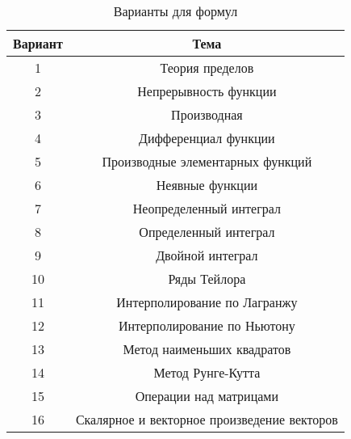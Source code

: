\documentclass[a4paper]{article}
\begin{document}
\begin{table}[h]
      \caption{Варианты для формул}
      \begin{center}\label{tab:math}
      \begin{tabular}{|c|c|}
        \hline
        Вариант & Тема \\
        \hline
        1 & Теория пределов\\
        \hline
        2 & Непрерывность функции\\
        \hline
        3 & Производная\\
        \hline
        4 & Дифференциал функции\\
        \hline
        5 & Производные элементарных функций\\
        \hline
        6 & Неявные функции\\
        \hline
        7 & Неопределенный интеграл\\
        \hline
        8 & Определенный интеграл\\
        \hline
        9 & Двойной интеграл\\
        \hline
        10 & Ряды Тейлора\\
        \hline
        11 & Интерполирование по Лагранжу\\
        \hline
        12 & Интерполирование по Ньютону\\
        \hline
        13 & Метод наименьших квадратов\\
        \hline
        14 & Метод Рунге-Кутта\\
        \hline
        15 & Операции над матрицами\\
        \hline
        16 & Скалярное и векторное произведение векторов\\
        \hline
      \end{tabular}
    \end{center}
\end{table}
\end{document}
